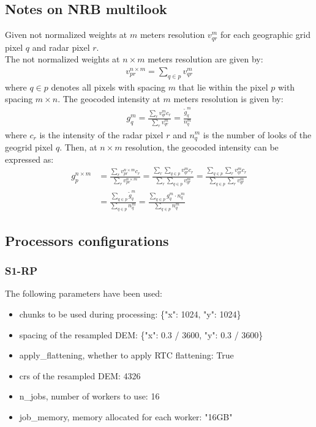 \subsection{Notes on NRB multilook}
\label{sec:nrb_multilook}
Given not normalized weights at $ m $  meters resolution $ v^{m}_{qr} $ for each geographic grid pixel $ q $ and radar pixel $ r $.\\
The not normalized weights at $ n \times m $  meters resolution are given by:
\begin{align}
v^{n \times m}_{pr} = \sum_{q \in p}^{} v^{m}_{qr}
\end{align}
where $q \in p$ denotes all pixels with spacing $m$ that lie within the pixel $p$ with spacing $m \times n$.
The geocoded intensity at $m$ meters resolution is given by:
\begin{align}
g^m_q = \frac{\sum_{r} v^{m}_{qr} c_r}{\sum_{r} v^{m}_{qr}} =\frac{\tilde{g}^m_q}{n_q^m} 
\end{align}
where $c_r$ is the intensity of the radar pixel $r$ and $n_q^m$ is the number of looks of the geogrid pixel $q$.
Then, at $ n \times m $ resolution, the geocoded intensity can be expressed as:
\begin{align}
g^{n \times m}_p &= \frac{\sum_{r} v^{n \times m}_{pr} c_r}{\sum_{r} v^{n \times m}_{pr}} = \frac{\sum_{r}\sum_{q \in p}^{} v^{m}_{qr} c_r}{\sum_{r} \sum_{q \in p}^{} v^{m}_{qr}}=\frac{\sum_{q \in p}^{} \sum_{r}v^{m}_{qr} c_r}{\sum_{q \in p}^{}\sum_{r} v^{m}_{qr}}\\
&= \frac{\sum_{q \in p}^{} \tilde{g}^m_q}{\sum_{q \in p}^{}n_q^m} = \frac{\sum_{q \in p}^{} {g}^m_q \cdot n^m_q}{\sum_{q \in p}^{}n_q^m}
\end{align}

\subsection{Processors configurations}
\label{sec:nrb_proc_config}

\subsubsection{S1-RP}
The following parameters have been used:
\begin{itemize}
    \item chunks to be used during processing: \{"x": 1024, "y": 1024\}
    \item spacing of the resampled DEM: \{"x": 0.3 / 3600, "y": 0.3 / 3600\}
    \item apply\_flattening, whether to apply RTC flattening: True
    \item crs of the resampled DEM: 4326
    \item n\_jobs, number of workers to use: 16
    \item job\_memory, memory allocated for each worker: "16GB"
\end{itemize}
    
